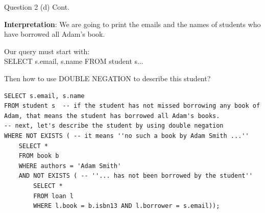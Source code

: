 \begin{frame}[fragile]{Question 2 (d) Cont.}

\textbf{Interpretation}: We are going to print the emails and the names of students who have borrowed all Adam's book.\\ \vspace{5pt}

Our query must start with:\\
SELECT s.email, s.name FROM student s... \\ \vspace{5pt}

Then how to use DOUBLE NEGATION to describe this student?

\begin{lstlisting}[style=sql-small]
SELECT s.email, s.name
FROM student s  -- if the student has not missed borrowing any book of Adam, that means the student has borrowed all Adam's books. 
-- next, let's describe the student by using double negation
WHERE NOT EXISTS ( -- it means ''no such a book by Adam Smith ...''
	SELECT * 
	FROM book b
	WHERE authors = 'Adam Smith' 
	AND NOT EXISTS ( -- ''... has not been borrowed by the student''
		SELECT * 
		FROM loan l
		WHERE l.book = b.isbn13 AND l.borrower = s.email));
\end{lstlisting}\vspace{5pt}
\end{frame}

